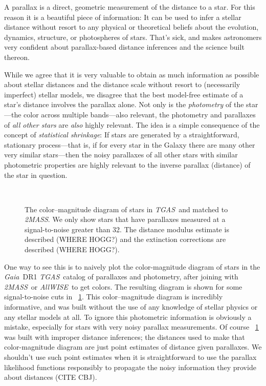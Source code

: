 \documentclass[12pt]{article}
\newcommand{\project}[1]{\textsl{#1}}
\newcommand{\acronym}[1]{\small{#1}}
\newcommand{\gaia}{\project{Gaia}}
\newcommand{\tgas}{\project{\acronym{TGAS}}}
\newcommand{\twomass}{\project{\acronym{2MASS}}}
\newcommand{\wise}{\project{All\acronym{WISE}}}
\begin{document}
A parallax is a direct, geometric measurement of the distance to a star.
For this reason it is a beautiful piece of information: It can be used
to infer a stellar distance without resort to any physical or
theoretical beliefs about the evolution, dynamics, structure, or
photospheres of stars.
That's sick, and makes astronomers very confident about parallax-based
distance inferences and the science built thereon.

While we agree that it is very valuable to obtain as much information
as possible about stellar distances and the distance scale without
resort to (necessarily imperfect) stellar models, we disagree that the
best model-free estimate of a star's distance involves the parallax
alone.
Not only is the \emph{photometry} of the star---the color across
multiple bands---also relevant, the photometry and parallaxes of
\emph{all other stars} are \emph{also} highly relevant.
The idea is a simple consequence of the concept of \emph{statistical shrinkage}:
If stars are generated by a straightforward, stationary process---that
is, if for every star in the Galaxy there are many other very similar
stars---then the noisy parallaxes of all other stars with similar
photometric properties are highly relevant to the inverse parallax
(distance) of the star in question.

\begin{figure}[p]
~~
\caption{The color--magnitude diagram of stars in \tgas\ and matched
  to \twomass. We only show stars that have parallaxes measured at a
  signal-to-noise greater than 32. The distance modulus estimate is
  described (WHERE HOGG?) and the extinction corrections are described
  (WHERE HOGG?).\label{fig:cmd}}
\end{figure}

One way to see this is to naively plot the color-magnitude diagram of
stars in the \gaia\ \acronym{DR1} \tgas\ catalog of parallaxes and
photometry, after joining with \twomass\ or \wise\ to get colors.
The resulting diagram is shown for some signal-to-noise cuts in
\figurename~\ref{fig:cmd}.
This color--magnitude diagram is incredibly informative, and was built
without the use of any knowledge of stellar physics or any stellar models at all.
To ignore this photometric information is obviously a mistake, especially for
stars with very noisy parallax measurements.
Of course \figurename~\ref{fig:cmd} was built with improper distance
inferences; the distances used to make that color-magnitude diagram
are just point estimates of distance given parallaxes.
We shouldn't use such point estimates when it is straightforward to
use the parallax likelihood functions responsibly to propagate the noisy
information they provide about distances (CITE CBJ).
\end{document}
